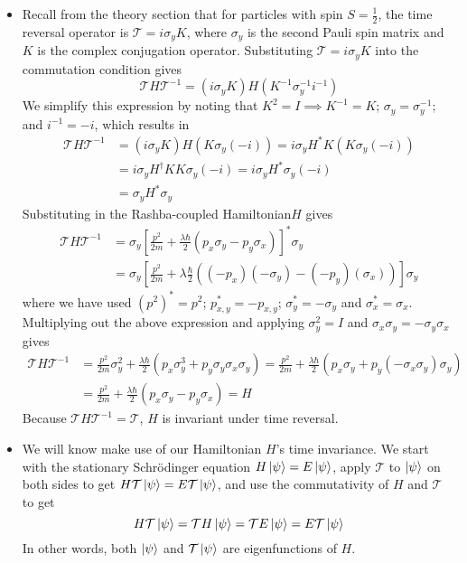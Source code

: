 \documentclass[11pt, a4paper]{article}
\newcommand{\schro}{Schr\"{o}dinger\xspace}
\newcommand{\Ham}{Hamiltonian\xspace}
\newcommand{\T}{\mathcal{T}}  %
\begin{document}
\begin{itemize}
	\item Recall from the theory section that for particles with spin $ S = \frac{1}{2} $, the time reversal operator is $ \T = i \sigma_{y} K $, where $ \sigma_{y} $ is the second Pauli spin matrix and $ K $ is the complex conjugation operator. Substituting $ \T = i \sigma_{y} K $ into the commutation condition gives
	\begin{equation*}
		\T H \T^{-1} = (i\sigma_{y}K)H(K^{-1}\sigma_{y}^{-1}i^{-1})
	\end{equation*}
	We simplify this expression by noting that $ K^{2} = I \implies K^{-1} = K$;  $ \sigma_{y} = \sigma_{y}^{-1} $; and $ i^{-1} = -i $, which results in
	\begin{align*}
		\T H \T^{-1} &= (i\sigma_{y}K)H(K\sigma_{y}(-i)) = i \sigma_{y} H^{*} K (K\sigma_{y}(-i)) \\
		&= i \sigma_{y} H^{\dagger} KK \sigma_{y}(-i) = i \sigma_{y}H^{*}\sigma_{y}(-i) \\
		&= \sigma_{y}H^{*} \sigma_{y}
	\end{align*} 
	Substituting in the Rashba-coupled \Ham $ H $ gives
	\begin{align*}
		\T H\T^{-1} &= \sigma_{y} \left[\frac{p^{2}}{2m} + \frac{\lambda\hbar}{2} (p_{x}\sigma_{y} - p_{y}\sigma_{x})\right]^{*}\sigma_{y} \\
		& = \sigma_{y}\left[\frac{p^{2}}{2m} + \lambda \frac{\hbar}{2}\left((-p_{x})(-\sigma_{y}) - (-p_{y})(\sigma_{x}) \right)\right]\sigma_{y}
	\end{align*}
	where we have used $ (p^{2})^{*} = p^{2} $; $ p_{x,y}^{*} = -p_{x,y} $; $ \sigma_{y}^{*} = -\sigma_{y} $ and $ \sigma_{x}^{*} = \sigma_{x} $. Multiplying out the above expression and applying $ \sigma_{y}^{2} = I $ and $ \sigma_{x}\sigma_{y} = -\sigma_{y}\sigma_{x} $ gives
	\begin{align*}
		\T H\T^{-1} & = \frac{p^{2}}{2m}\sigma_{y}^{2} + \frac{\lambda\hbar}{2}\left(p_{x}\sigma_{y}^{3} + p_{y}\sigma_{y}\sigma_{x}\sigma_{y}\right) = \frac{p^{2}}{2m} + \frac{\lambda\hbar}{2}\left(p_{x}\sigma_{y} + p_{y}(-\sigma_{x}\sigma_{y})\sigma_{y}\right)\\
		&= \frac{p^{2}}{2m} + \frac{\lambda\hbar}{2} \left(p_{x}\sigma_{y} - p_{y}\sigma_{x}\right) = H
	\end{align*}
	Because $ \T H\T^{-1} = \T$, $ H $ is invariant under time reversal.
	
	\item We will know make use of our Hamiltonian $ H $'s time invariance. We start with the stationary \schro equation $ H \ket{\psi} = E \ket{\psi} $, apply $ \T $ to $ \ket{\psi} $ on both sides to get  $ H \T\ket{\psi} = E \T\ket{\psi} $, and use the commutativity of $ H $ and $ \T $ to get
	\begin{equation*}
		H \T \ket{\psi} = \T H \ket{\psi} = \T E \ket{\psi} = E \T \ket{\psi}
	\end{equation*}
	In other words, both $ \ket{\psi} $ and $ \T\ket{\psi} $ are eigenfunctions of $ H $. 
	

\end{itemize}
\end{document}
